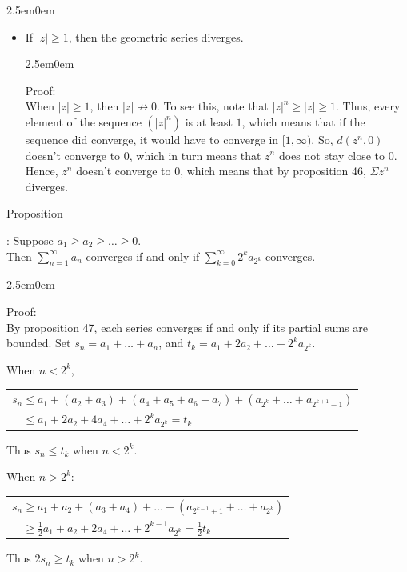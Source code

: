 \documentclass{book}
\newcommand{\hThree}{%
   \color{PineGreen}
   \fontsize{13}{15}\selectfont%
}
\newenvironment{myIndent}{%
   \begin{adjustwidth}{2.5em}{0em}%
}{%
   \end{adjustwidth}%
}
\newcommand{\retTwo}{\hfill\bigbreak}
\newcounter{PropNumber}
\newcommand{\propCount}[1][1]{%
   \addtocounter{PropNumber}{#1}%
   \thePropNumber%
}
\begin{document}
{\begin{myIndent}
\begin{itemize}
            \newpage

            \item If $|z| \geq 1$, then the geometric series diverges.
            
            {\begin{myIndent} \hThree
               Proof:\\
               When $|z| \geq 1$, then $|z| \not\rightarrow 0$. To see this, note that $|z|^n \geq |z| \geq 1$. Thus, every element of the sequence $(|z|^n)$ is at least $1$, which means that if the sequence did converge, it would have to converge in $[1, \infty)$. So, $d(z^n, 0)$ doesn't converge to $0$, which in turn means that $z^n$ does not stay close to $0$. Hence, $z^n$ doesn't converge to $0$, which means that by proposition 46, $\Sigma z^n$ diverges. \retTwo
            \end{myIndent}}
         \end{itemize}

         Proposition \propCount: Suppose $a_1 \geq a_2 \geq \ldots \geq 0$.\\ Then $\sum\limits_{n=1}^\infty{a_n}$ converges if and only if $\sum\limits_{k=0}^\infty{2^ka_{2^k}}$ converges.
         {\begin{myIndent} \hThree
            Proof:\\
            By proposition 47, each series converges if and only if its partial sums are bounded. Set $s_n = a_1 + \ldots + a_n$, and $t_k = a_1 + 2a_2 + \ldots + 2^ka_{2^k}$. \retTwo

            When $n < 2^k$,\\
            \begin{tabular}{l}
              $s_n \leq a_1 + (a_2 + a_3) + (a_4 + a_5 + a_6 + a_7) + (a_{2^k}+\ldots+a_{2^{k+1}-1})$\\
              $\phantom{s_n} \leq a_1 + 2a_2 + 4a_4 + \ldots + 2^ka_{2^k} = t_k$
            \end{tabular}\retTwo
            Thus $s_n \leq t_k$ when $n < 2^k$. \retTwo

            When $n > 2^k$:\\
            \begin{tabular}{l}
               $s_n \geq a_1 + a_2 + (a_3 + a_4) + \ldots + (a_{2^{k-1} + 1}+\ldots+a_{2^{k}})$\\
               $\phantom{s_n} \geq \frac{1}{2}a_1 + a_2 + 2a_4 + \ldots + 2^{k-1}a_{2^k} = \frac{1}{2}t_k$
            \end{tabular}\retTwo
            Thus $2s_n \geq t_k$ when $n > 2^k$. \retTwo
            

\end{myIndent}}
\end{myIndent}}
\end{document}
